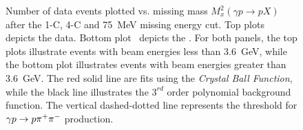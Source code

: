 \begin{figure}[h!]\begin{center}

\caption[Number of data events plotted vs. squared missing mass $M^{2}_x(\gamma p \to p X)$ after the 1-C, 4-C and 75~MeV missing energy cut]{\label{kinefit.mm2p.data.MC}Number of data events plotted vs. missing mass $M^{2}_x(\gamma p \to p X)$ after the 1-C, 4-C and 75~MeV missing energy cut. Top plots~ depicts the data. Bottom plot~ depicts the . For both panels, the top plots illustrate events with beam energies less than 3.6~GeV, while the bottom plot illustrates events with beam energies greater than 3.6~GeV. The red solid line are fits using the \emph{Crystal Ball Function}, while the black line illustrates the $3^{rd}$ order polynomial background function. The vertical dashed-dotted line represents the threshold for $\gamma p \to p \pi^+\pi^-$ production. }

\end{center}\end{figure}
\FloatBarrier
